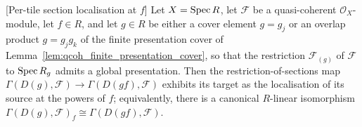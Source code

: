 \begin{lemma}

[Per-tile section localisation at \(f\)]
  \label{lem:tile_section_localization}
  Let \(X = \operatorname{Spec} R\), let \(\mathcal{F}\) be a quasi-coherent \(\mathcal{O}_X\)-module, let \(f \in R\),
  and let \(g \in R\) be either a cover element \(g = g_j\) or an overlap product \(g = g_j g_k\) of the
  finite presentation cover of Lemma~\ref{lem:qcoh_finite_presentation_cover}, so that the restriction \(\mathcal{F}_{(g)}\) of
  \(\mathcal{F}\) to \(\operatorname{Spec} R_g\) admits a global presentation. Then the restriction-of-sections map
  \(\Gamma(D(g), \mathcal{F}) \to \Gamma(D(gf), \mathcal{F})\) exhibits its target as the localisation of
  its source at the powers of \(f\); equivalently, there is a canonical \(R\)-linear isomorphism
  \(\Gamma(D(g), \mathcal{F})_f \cong \Gamma(D(gf), \mathcal{F})\).
\end{lemma}
